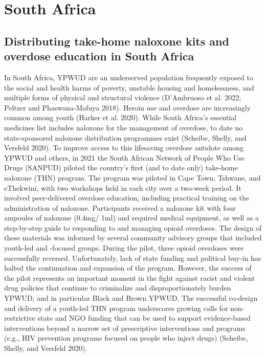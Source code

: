 \documentclass[
  letterpaper,
  DIV=11,
  numbers=noendperiod]{scrartcl}
\begin{document}
\section{South Africa}

\subsection{Distributing take-home naloxone kits and overdose education
in South
Africa}\label{distributing-take-home-naloxone-kits-and-overdose-education-in-south-africa}

In South Africa, YPWUD are an underserved population frequently exposed
to the social and health harms of poverty, unstable housing and
homelessness, and multiple forms of physical and structural violence
(D'Ambruoso et al. 2022; Peltzer and Phaswana-Mafuya 2018). Heroin use
and overdose are increasingly common among youth (Harker et al. 2020).
While South Africa's essential medicines list includes naloxone for the
management of overdose, to date no state-sponsored naloxone distribution
programmes exist (Scheibe, Shelly, and Versfeld 2020). To improve access
to this lifesaving overdose antidote among YPWUD and others, in 2021 the
South African Network of People Who Use Drugs (SANPUD) piloted the
country's first (and to date only) take-home naloxone (THN) program. The
program was piloted in Cape Town, Tshwane, and eThekwini, with two
workshops held in each city over a two-week period. It involved
peer-delivered overdose education, including practical training on the
administration of naloxone. Participants received a naloxone kit with
four ampoules of naloxone (0.4mg/ 1ml) and required medical equipment,
as well as a step-by-step guide to responding to and managing opioid
overdoses. The design of these materials was informed by several
community advisory groups that included youth-led and -focused groups.
During the pilot, three opioid overdoses were successfully reversed.
Unfortunately, lack of state funding and political buy-in has halted the
continuation and expansion of the program. However, the success of the
pilot represents an important moment in the fight against racist and
violent drug policies that continue to criminalize and
disproportionately burden YPWUD, and in particular Black and Brown
YPWUD. The successful co-design and delivery of a youth-led THN program
underscores growing calls for non-restrictive state and NGO funding that
can be used to support evidence-based interventions beyond a narrow set
of prescriptive interventions and programs (e.g., HIV prevention
programs focused on people who inject drugs) (Scheibe, Shelly, and
Versfeld 2020).
\end{document}
